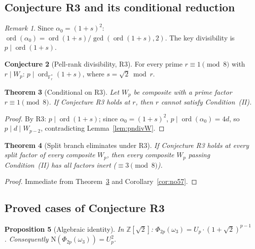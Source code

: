 \documentclass[11pt]{amsart}
\theoremstyle{plain}
\newtheorem{theorem}{Theorem}[section]
\newtheorem{proposition}[theorem]{Proposition}
\theoremstyle{definition}
\newtheorem{conjecture}[theorem]{Conjecture}
\theoremstyle{remark}
\newtheorem{remark}[theorem]{Remark}
\numberwithin{equation}{section}
\newcommand{\ord}{\operatorname{ord}}
\newcommand{\Z}{\mathbb{Z}}
\newcommand{\F}{\mathbb{F}}
\begin{document}
\subsection{Conjecture R3 and its conditional reduction}

\begin{remark}\label{rem:alpha0-square}
Since $\alpha_0 = (1 + s)^2$: $\ord(\alpha_0) = \ord(1 + s) / \gcd(\ord(1+s), 2)$. The key divisibility is $p \mid \ord(1 + s)$.
\end{remark}

\begin{conjecture}[Pell-rank divisibility, R3]\label{conj:R3}
For every prime $r \equiv 1 \pmod 8$ with $r \mid W_p$: $p \mid \ord_{\F_r^\ast}(1 + s)$, where $s = \sqrt 2 \bmod r$.
\end{conjecture}

\begin{theorem}[Conditional on R3]\label{thm:cond-R3}
Let $W_p$ be composite with a prime factor $r \equiv 1 \pmod 8$. If Conjecture R3 holds at $r$, then $r$ cannot satisfy Condition~(II).
\end{theorem}

\begin{proof}
By R3: $p \mid \ord(1 + s)$; since $\alpha_0 = (1+s)^2$, $p \mid \ord(\alpha_0) = 4d$, so $p \mid d \mid W_{p-2}$, contradicting Lemma~\ref{lem:pndivW}.
\end{proof}

\begin{theorem}[Split branch eliminates under R3]\label{thm:R3-eliminates}
If Conjecture R3 holds at every split factor of every composite $W_p$, then every composite $W_p$ passing Condition~(II) has all factors inert ($\equiv 3 \pmod 8$).
\end{theorem}

\begin{proof}
Immediate from Theorem~\ref{thm:cond-R3} and Corollary~\ref{cor:no57}.
\end{proof}

\subsection{Proved cases of Conjecture R3}

\begin{proposition}[Algebraic identity]\label{prop:alg-identity}
In $\Z[\sqrt 2]$: $\Phi_{2p}(\omega_3) = U_p \cdot (1 + \sqrt 2)^{p-1}$. Consequently $\mathrm{N}(\Phi_{2p}(\omega_3)) = U_p^2$.
\end{proposition}
\end{document}

